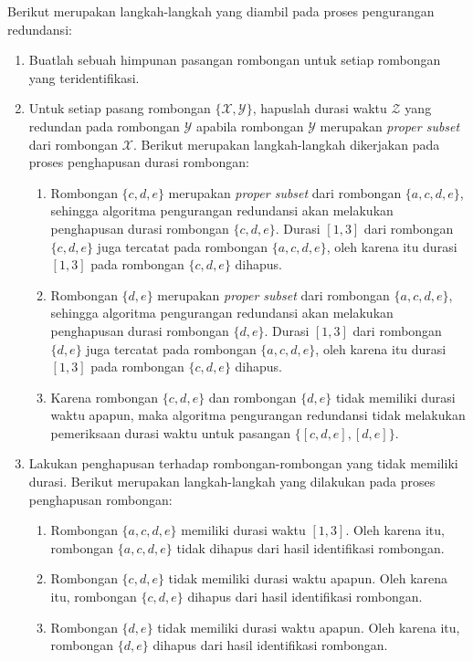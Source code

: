\noindent Berikut merupakan langkah-langkah yang diambil pada proses pengurangan redundansi:

\begin{enumerate}
    \item Buatlah sebuah himpunan pasangan rombongan untuk setiap rombongan yang teridentifikasi.
    
    \item Untuk setiap pasang rombongan $\{ \mathcal{X}, \mathcal{Y} \}$, hapuslah durasi waktu $\mathcal{Z}$ yang redundan pada rombongan $\mathcal{Y}$ apabila rombongan $\mathcal{Y}$ merupakan \textit{proper subset} dari rombongan $\mathcal{X}$. Berikut merupakan langkah-langkah dikerjakan pada proses penghapusan durasi rombongan:
    
    \begin{enumerate}
        \item Rombongan $\{c, d, e\}$ merupakan \textit{proper subset} dari rombongan $\{a, c, d, e\}$, sehingga algoritma pengurangan redundansi akan melakukan penghapusan durasi rombongan $\{c, d, e\}$. Durasi $[1, 3]$ dari rombongan $\{c, d, e\}$ juga tercatat pada rombongan $\{a, c, d, e\}$, oleh karena itu durasi $[1, 3]$ pada rombongan $\{c, d, e\}$ dihapus.
        \item Rombongan $\{d, e\}$ merupakan \textit{proper subset} dari rombongan $\{a, c, d, e\}$, sehingga algoritma pengurangan redundansi akan melakukan penghapusan durasi rombongan $\{d, e\}$. Durasi $[1, 3]$ dari rombongan $\{d, e\}$ juga tercatat pada rombongan $\{a, c, d, e\}$, oleh karena itu durasi $[1, 3]$ pada rombongan $\{c, d, e\}$ dihapus.
        \item Karena rombongan $\{c, d, e\}$ dan rombongan $\{d, e\}$ tidak memiliki durasi waktu apapun, maka algoritma pengurangan redundansi tidak melakukan pemeriksaan durasi waktu untuk pasangan $\{ [c, d, e], [d, e] \}$.
    \end{enumerate}
    
    \item Lakukan penghapusan terhadap rombongan-rombongan yang tidak memiliki durasi. Berikut merupakan langkah-langkah yang dilakukan pada proses penghapusan rombongan:
    
    \begin{enumerate}
        \item Rombongan $\{a, c, d, e\}$ memiliki durasi waktu $[1, 3]$. Oleh karena itu, rombongan $\{a, c, d, e\}$ tidak dihapus dari hasil identifikasi rombongan.
        \item Rombongan $\{ c, d, e \}$ tidak memiliki durasi waktu apapun. Oleh karena itu, rombongan $\{ c, d, e \}$ dihapus dari hasil identifikasi rombongan.
        \item Rombongan $\{ d, e \}$ tidak memiliki durasi waktu apapun. Oleh karena itu, rombongan $\{ d, e \}$ dihapus dari hasil identifikasi rombongan.
    \end{enumerate}
\end{enumerate}

